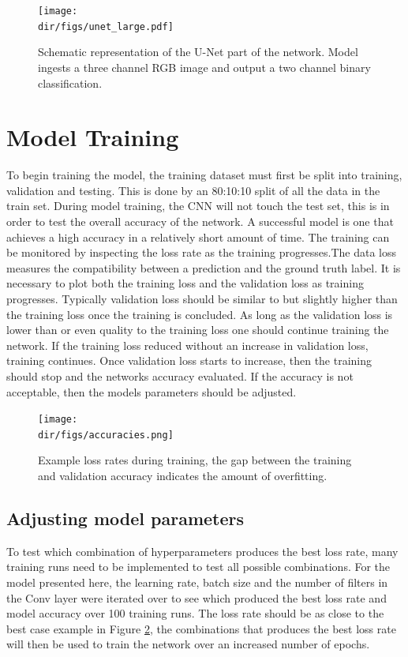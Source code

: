 \begin{figure}[htpb]
    \centering
    \texttt{[image: \\dir/figs/unet\_large.pdf]}
    \caption[Schematic representation of the U-Net part of the network]{Schematic representation of the U-Net part of the network. Model ingests a three channel RGB image and output a two channel binary classification.}
    \label{fig.unet_large}
\end{figure}
\section{Model Training}
To begin training the model, the training dataset must first be split into training, validation and testing. This is done by an 80:10:10 split of all the data in the train set. During model training, the CNN will not touch the test set, this is in order to test the overall accuracy of the network. A successful model is one that achieves a high accuracy in a relatively short amount of time. The training can be monitored by inspecting the loss rate as the training progresses.The data loss measures the compatibility between a prediction and the ground truth label. It is necessary to plot both the training loss and the validation loss as training progresses. Typically validation loss should be similar to but slightly higher than the training loss once the training is concluded. As long as the validation loss is lower than or even quality to the training loss one should continue training the network. If the training loss reduced without an increase in validation loss, training continues. Once validation loss starts to increase, then the training should stop and the networks accuracy evaluated. If the accuracy is not acceptable, then the models parameters should be adjusted. 
\begin{figure}[htpb]
    \centering
    \texttt{[image: \\dir/figs/accuracies.png]}
    \caption[Example loss rates during training]{Example loss rates during training, the gap between the training and validation accuracy indicates the amount of overfitting.}
    \label{fig.accuracies}
\end{figure}
\subsection{Adjusting model parameters}
To test which combination of hyperparameters produces the best loss rate, many training runs need to be implemented to test all possible combinations. For the model presented here, the learning rate, batch size and the number of filters in the Conv layer were iterated over to see which produced the best loss rate and model accuracy over 100 training runs. The loss rate should be as close to the best case example in Figure \ref{fig.accuracies}, the combinations that produces the best loss rate will then be used to train the network over an increased number of epochs. 
